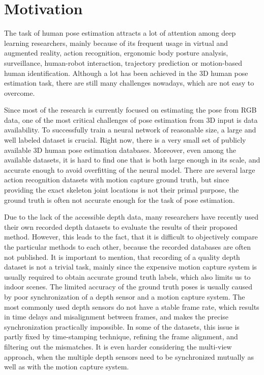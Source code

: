 \chapter{Motivation}\label{chap:motivation}

The task of human pose estimation attracts a lot of attention among deep learning researchers, mainly because of its frequent usage in virtual and augmented reality, action recognition, ergonomic body posture analysis, surveillance, human-robot interaction, trajectory prediction or motion-based human identification. Although a lot has been achieved in the 3D human pose estimation task, there are still many challenges nowadays, which are not easy to overcome.\par
\vspace{5mm}
\noindent Since most of the research is currently focused on estimating the pose from RGB data, one of the most critical challenges of pose estimation from 3D input is data availability. To successfully train a neural network of reasonable size, a large and well labeled dataset is crucial. Right now, there is a very small set of publicly available 3D human pose estimation databases. Moreover, even among the available datasets, it is hard to find one that is both large enough in its scale, and accurate enough to avoid overfitting of the neural model. There are several large action recognition datasets with motion capture ground truth, but since providing the exact skeleton joint locations is not their primal purpose, the ground truth is often not accurate enough for the task of pose estimation.\par
\vspace{5mm}
\noindent Due to the lack of the accessible depth data, many researchers have recently used their own recorded depth datasets to evaluate the results of their proposed method. However, this leads to the fact, that it is difficult to objectively compare the particular methods to each other, because the recorded databases are often not published.
It is important to mention, that recording of a quality depth dataset is not a trivial task, mainly since the expensive motion capture system is usually required to obtain accurate ground truth labels, which also limits us to indoor scenes. The limited accuracy of the ground truth poses is usually caused by poor synchronization of a depth sensor and a motion capture system. The most commonly used depth sensors do not have a stable frame rate, which results in time delays and misalignment between frames, and makes the precise synchronization practically impossible. In some of the datasets, this issue is partly fixed by time-stamping technique, refining the frame alignment, and filtering out the mismatches. It is even harder considering the multi-view approach, when the multiple depth sensors need to be synchronized mutually as well as with the motion capture system. %
